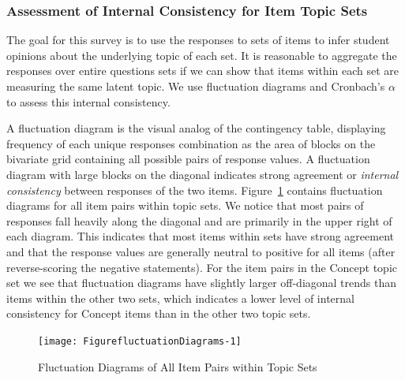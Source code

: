 \documentclass[11pt]{isuthesis}\usepackage[]{graphicx}\usepackage[]{color}
\newenvironment{knitrout}{}{} %
\begin{document}
\subsubsection{Assessment of Internal Consistency for Item Topic Sets} 

The goal for this survey is to use the responses to sets of items to infer student opinions about the underlying topic of each set.  It is reasonable to aggregate the responses over entire questions sets if we can show that items within each set are measuring the same latent topic. We use fluctuation diagrams and Cronbach's $\alpha$ \citep{cronbach:51} to assess this internal consistency. 

A fluctuation diagram is the visual analog of the contingency table, displaying frequency of each unique responses combination as the area of blocks on the bivariate grid containing all possible pairs of response values. A fluctuation diagram with large blocks on the diagonal indicates strong agreement or {\it internal consistency} between responses of the two items.  Figure~\ref{fig:fluctuationDiagrams} contains fluctuation diagrams for all item pairs within topic sets.    
We notice that most pairs of responses fall heavily along the diagonal and are primarily in the upper right of each diagram. This indicates that most items within sets have strong agreement and that the response values are generally neutral to positive for all items (after reverse-scoring the negative statements).
For the item pairs in the Concept topic set we see that fluctuation diagrams have slightly larger off-diagonal trends than items within the other two sets, which indicates a lower level of internal consistency for Concept items than in the other two topic sets. 

\begin{knitrout}
\color{fgcolor}\begin{figure}[hbt]

{\centering \texttt{[image: FigurefluctuationDiagrams-1]} 

}

\caption[Fluctuation Diagrams of All Item Pairs within Topic Sets]{Fluctuation Diagrams of All Item Pairs within Topic Sets}\label{fig:fluctuationDiagrams}
\end{figure}


\end{knitrout}
\end{document}
